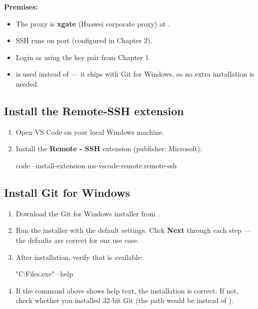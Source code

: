 \documentclass{guide}
\begin{document}
\begin{infobox}
\textbf{Premises:}
\begin{itemize}
  \item The proxy is \textbf{xgate} (Huawei corporate proxy) at
        .
  \item SSH runs on port  (configured in Chapter 2).
  \item Login as  using the key pair from Chapter 1.
  \item {} is used instead of  --- it ships
        with Git for Windows, so no extra installation is needed.
\end{itemize}
\end{infobox}

\subsection{Install the Remote-SSH extension}

\stepbystep
\begin{enumerate}
  \item Open VS Code on your local Windows machine.
  \item Install the \textbf{Remote - SSH} extension (publisher: Microsoft):

  \begin{code}[bash]
code --install-extension ms-vscode-remote.remote-ssh
  \end{code}
\end{enumerate}

\subsection{Install Git for Windows}


\stepbystep
\begin{enumerate}
  \item Download the Git for Windows installer from
        .
  \item Run the installer with the default settings. Click \textbf{Next}
        through each step --- the defaults are correct for our use case.
  \item After installation, verify that  is available:

  \begin{code}[bash]
"C:\Program Files\Git{}\bin\connect.exe" --help
  \end{code}

  \item If the command above shows help text, the installation is correct.
        If not, check whether you installed 32-bit Git (the path would be
         instead of ).
\end{enumerate}
\end{document}
